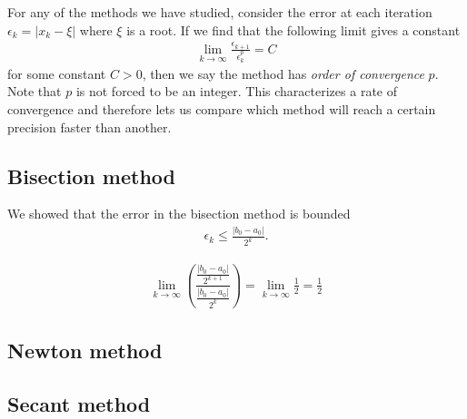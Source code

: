 For any of the methods we have studied, consider the error at each iteration $\epsilon_k = |x_k - \xi|$ where $\xi$ is a root. If we find that the following limit gives a constant 
\begin{align*}
\lim_{k\to\infty} \frac{\epsilon_{k+1}}{\epsilon_k^p} = C
\end{align*}
for some constant $C>0$, then we say the method has \textit{order of convergence} $p$. Note that $p$ is not forced to be an integer. This characterizes a rate of convergence and therefore lets us compare which method will reach a certain precision faster than another.

\subsection*{Bisection method}
We showed that the error in the bisection method is bounded
\begin{align*}
\epsilon_k \leq \frac{|b_0 - a_0|}{2^k}.
\end{align*}

\begin{align*}
\lim_{k\to\infty}\left( \dfrac{\frac{|b_0 - a_0|}{2^{k+1}}}{\frac{|b_0 - a_0|}{2^k}} \right)
=
\lim_{k\to\infty} \frac{1}{2}
=
\frac{1}{2}
\end{align*}


\subsection*{Newton method}
\subsection*{Secant method}


